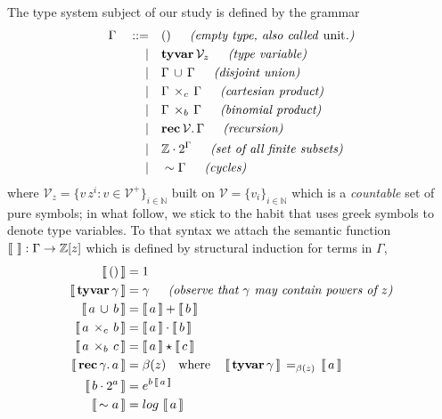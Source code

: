 The type system subject of our study is defined by the grammar
\begin{displaymath}
\begin{split}
\Gamma\quad::=\quad&()\indent\textit{(empty type, also called \emph{unit}.)} \\
             |\quad&\textbf{tyvar}\,\mathcal{V}_{z}\indent\textit{(type variable)} \\
             |\quad&\Gamma\,\cup\,\Gamma\indent\textit{(disjoint union)} \\
             |\quad&\Gamma\,\times_{c}\,\Gamma\indent\textit{(cartesian product)} \\
             |\quad&\Gamma\,\times_{b}\,\Gamma\indent\textit{(binomial product)} \\
             |\quad&\textbf{rec}\,\mathcal{V}.\,\Gamma\indent\textit{(recursion)} \\
             |\quad&\mathbb{Z}\cdot2^{\Gamma}\indent\textit{(set of all finite subsets)} \\
             |\quad&\sim\Gamma\indent\textit{(cycles)} \\
\end{split}
\end{displaymath}
where $\mathcal{V}_{z} = \lbrace v\,z^{i}:v\in\mathcal{V}^{+} \rbrace_{i\in\mathbb{N}}$ built on
$\mathcal{V}=  \lbrace v_{i} \rbrace_{i\in\mathbb{N}}$ which is a
\textit{countable} set of pure symbols; in what follow, we stick to the habit
that uses greek symbols to denote type variables. To that syntax we attach the
semantic function $\left\llbracket\,\,\right\rrbracket: \Gamma \rightarrow \mathbb{Z}[z]$ which is
defined by structural induction for terms in $\Gamma$,
\begin{displaymath}
\begin{split}
    \semantic{()} &= 1 \\
    \semantic{\textbf{tyvar}\,\gamma} &= \gamma\indent\textit{(observe that $\gamma$ may contain powers of $z$)} \\
    \semantic{a\,\cup\,b} &= \semantic{a} + \semantic{b} \\
    \semantic{a\,\times_{c}\,b} &= \semantic{a}\cdot\semantic{b} \\
    \semantic{a\,\times_{b}\,c} &= \semantic{a}\star\semantic{c} \\
    \semantic{\textbf{rec}\,\gamma.\,a} &= \beta(z)  \quad\text{where}\quad
        \semantic{\textbf{tyvar}\,\gamma}\,=_{\beta(z)}\,\semantic{a}\\
    \semantic{b\cdot2^{a}} &= e^{b\,\semantic{a}}\\
    \semantic{\sim a} &= log\,\semantic{a}\\
\end{split}
\end{displaymath}
